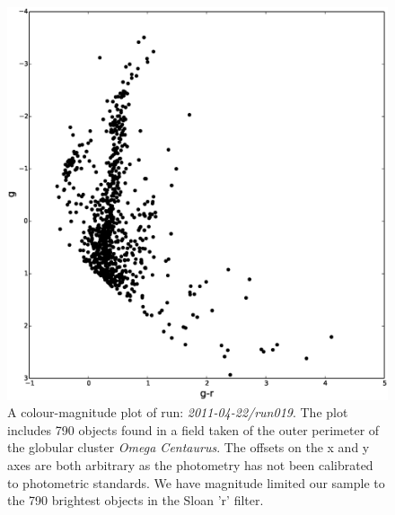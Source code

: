 \begin{figure}
\centering
\includegraphics[width=120mm]{images/2011-04-22-run019-omegacen-colourmagnitude.eps}
\caption{A colour-magnitude plot of run: \emph{2011-04-22/run019}. The plot includes 790 objects found in a field taken of the outer perimeter of the globular cluster \emph{Omega Centaurus}. The offsets on the x and y axes are both arbitrary as the photometry has not been calibrated to photometric standards. We have magnitude limited our sample to the 790 brightest objects in the Sloan 'r' filter.}
\label{fig:OmegaCen-colourmagnitude}
\end{figure}

